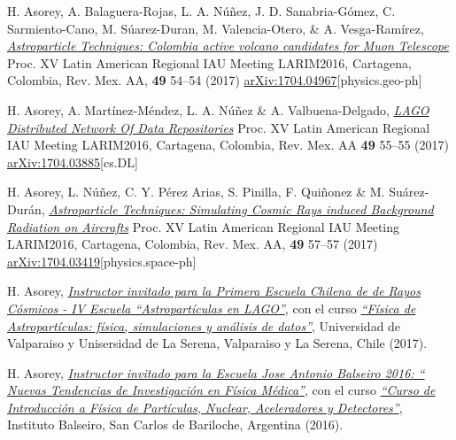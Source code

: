 \begin{etaremune}
\item {} H. Asorey, A. Balaguera-Rojas, L. A. Núñez, J. D. Sanabria-Gómez, C. Sarmiento-Cano, M. Súarez-Duran, M. Valencia-Otero, \& A. Vesga-Ramírez, \href{http://www.astroscu.unam.mx/rmaa/RMxAC..49/PDF/RMxAC..49\_oral4.pdf}{\emph{Astroparticle Techniques: Colombia active volcano candidates for Muon Telescope}} \en Proc. XV Latin American Regional IAU Meeting LARIM2016, Cartagena, Colombia, Rev. Mex. AA, {\bf{49}} 54--54 (2017) \href{http://arxiv.org/abs/1704.04967}{arXiv:1704.04967}[physics.geo-ph]

\item {}H. Asorey, A. Martínez-Méndez, L. A. Núñez \& A. Valbuena-Delgado, \href{http://www.astroscu.unam.mx/rmaa/RMxAC..49/PDF/RMxAC..49\_oral5.pdf}{\emph{LAGO Distributed Network Of Data Repositories}} \en Proc. XV Latin American Regional IAU Meeting LARIM2016, Cartagena, Colombia, Rev. Mex. AA {\bf{49}} 55--55 (2017) \href{http://arxiv.org/abs/1704.03885}{arXiv:1704.03885}[cs.DL]

\item {}H. Asorey, L. Núñez, C. Y. Pérez Arias, S. Pinilla, F. Quiñonez \& M. Suárez-Durán, \href{http://www.astroscu.unam.mx/rmaa/RMxAC..49/PDF/RMxAC..49\_oral7.pdf}{\emph{Astroparticle Techniques: Simulating Cosmic Rays induced Background Radiation on Aircrafts}} \en Proc. XV Latin American Regional IAU Meeting LARIM2016, Cartagena, Colombia, Rev. Mex. AA, {\bf{49}} 57--57 (2017) \href{http://arxiv.org/abs/1704.03419}{arXiv:1704.03419}[physics.space-ph]

\item {} H. Asorey, \href{http://ifa.uv.cl/rayoscosmicos/}{\emph{Instructor invitado para la Primera Escuela Chilena de de Rayos Cósmicos - IV Escuela ``Astropartículas en LAGO''}}, con el curso \href{https://github.com/lagoproject/astroparticulas}{\emph{``Física de Astropartículas: física, simulaciones y análisis de datos''}}, Universidad de Valparaiso y Unisersidad de La Serena, Valparaiso y La Serena, Chile (2017).

\item {} H. Asorey, \href{https://fisica.cab.cnea.gov.ar/jab2016/}{\emph{Instructor invitado para la Escuela Jose Antonio Balseiro 2016: `` Nuevas Tendencias de Investigación en Física Médica''}}, con el curso \href{ https://github.com/asoreyh/intro-nuclear-fisica-medica }{\emph{``Curso de Introducción a Física de Partículas, Nuclear, Aceleradores y Detectores''}}, Instituto Balseiro, San Carlos de Bariloche, Argentina (2016).


\end{etaremune}
